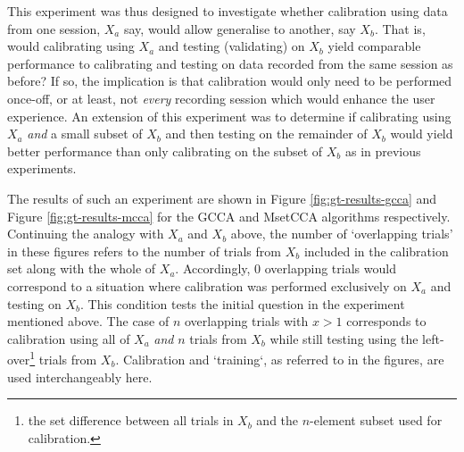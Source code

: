 This experiment was thus designed to investigate whether calibration using data from one session, $X_a$ say, would allow generalise to another, say $X_b$. That is, would calibrating using $X_a$ and testing (validating) on $X_b$ yield comparable performance to calibrating and testing on data recorded from the same session as before? If so, the implication is that calibration would only need to be performed once-off, or at least, not \textit{every} recording session which would enhance the user experience. An extension of this experiment was to determine if calibrating using $X_a$ \textit{and} a small subset of $X_b$ and then testing on the remainder of $X_b$ would yield better performance than only calibrating on the subset of $X_b$ as in previous experiments.

The results of such an experiment are shown in Figure \ref{fig:gt-results-gcca} and Figure \ref{fig:gt-results-mcca} for the GCCA and MsetCCA algorithms respectively. Continuing the analogy with $X_a$ and $X_b$ above, the number of `overlapping trials' in these figures refers to the number of trials from $X_b$ included in the calibration set along with the whole of $X_a$. Accordingly, 0 overlapping trials would correspond to a situation where calibration was performed exclusively on $X_a$ and testing on $X_b$. This condition tests the initial question in the experiment mentioned above. The case of $n$ overlapping trials with $x>1$ corresponds to calibration using all of $X_a$ \textit{and} $n$ trials from $X_b$ while still testing using the left-over\footnote{the set difference between all trials in $X_b$ and the $n$-element subset used for calibration.} trials from $X_b$. Calibration and `training`, as referred to in the figures, are used interchangeably here.

